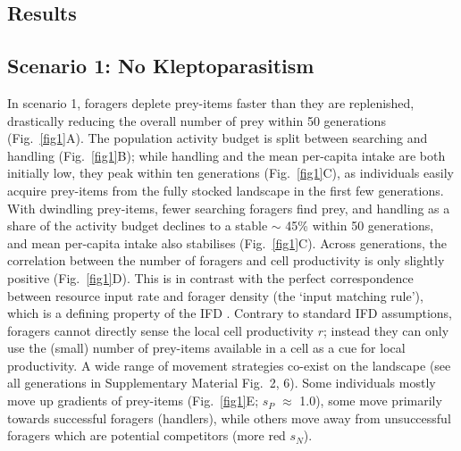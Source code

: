 \begin{refsection}[sorting=nyt]
\section*{Results}

\subsection*{Scenario 1: No Kleptoparasitism}

In scenario 1, foragers deplete prey-items faster than they are replenished, drastically reducing the overall number of prey within 50 generations (Fig.~\ref{fig1}A).
The population activity budget is split between searching and handling (Fig.~\ref{fig1}B); while handling and the mean per-capita intake are both initially low, they peak within ten generations (Fig.~\ref{fig1}C), as individuals easily acquire prey-items from the fully stocked landscape in the first few generations.
With dwindling prey-items, fewer searching foragers find prey, and handling as a share of the activity budget declines to a stable $\sim$ 45\% within 50 generations, and mean per-capita intake also stabilises (Fig.~\ref{fig1}C).
Across generations, the correlation between the number of foragers and cell productivity is only slightly positive (Fig.~\ref{fig1}D).
This is in contrast with the perfect correspondence between resource input rate and forager density (the `input matching rule'), which is a defining property of the IFD \citep{parker1978, houston2008}.
Contrary to standard IFD assumptions, foragers cannot directly sense the local cell productivity $r$; instead they can only use the (small) number of prey-items available in a cell as a cue for local productivity.
A wide range of movement strategies co-exist on the landscape (see all generations in Supplementary Material Fig.~2, 6).
Some individuals mostly move up gradients of prey-items (Fig.~\ref{fig1}E; $s_P$ $\approx$ 1.0), some move primarily towards successful foragers (handlers), while others move away from unsuccessful foragers which are potential competitors (more red $s_N$).


\end{refsection}

